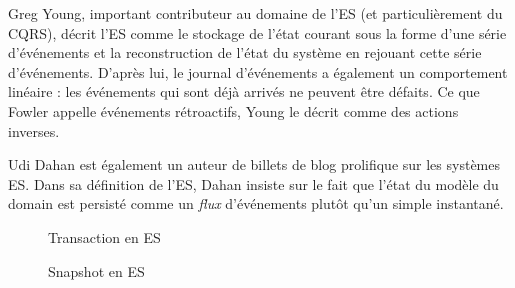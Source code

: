 Greg Young, important contributeur au domaine de l'\gls{ES} (et particulièrement du \gls{CQRS}), 
décrit l'\gls{ES} comme \og le stockage de l'état courant sous la forme 
d'une série d'événements et la reconstruction de l'état du système en rejouant 
cette série d'événements\fg{}. D'après lui, le journal d'événements a également 
un comportement linéaire : les événements qui sont déjà arrivés ne peuvent 
être défaits. Ce que Fowler appelle événements rétroactifs, Young le décrit 
comme des actions inverses.

Udi Dahan est également un auteur de billets de blog 
prolifique sur les systèmes \gls{ES}. Dans sa définition de l'\gls{ES}, Dahan 
insiste sur le fait que \og l'état du modèle du domain est persisté comme un 
\textit{flux} d'événements plutôt qu'un simple instantané\fg{}.


%
	\begin{figure}[!h]
		
		\centering
		\noindent
	
		\caption{Transaction en \gls{ES}}
		\label{fig:es-transaction}
	\end{figure}

	
	\begin{figure}[t]
		\centering
		
		\hfill
		\caption{Snapshot en \gls{ES}}
	\end{figure}

